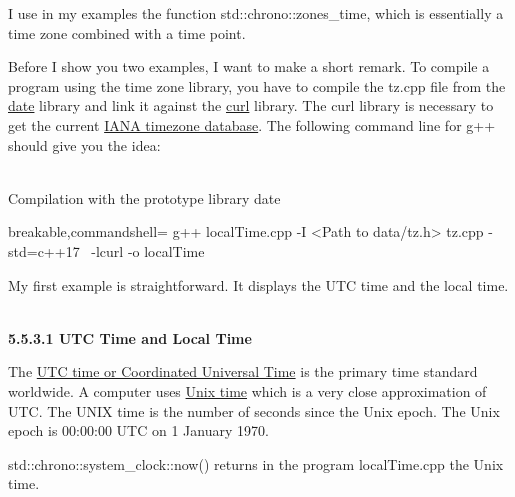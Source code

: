 I use in my examples the function std::chrono::zones\_time, which is essentially a time zone combined with a time point.

\begin{tcolorbox}[breakable,enhanced jigsaw,colback=blue!5!white,colframe=blue!75!black,title={Compilation of the examples}]
	
Before I show you two examples, I want to make a short remark. To compile a program using the time zone library, you have to compile the tz.cpp file from the \href{https://github.com/HowardHinnant/date}{date} library and link it against the \href{https://curl.se/}{curl} library. The curl library is necessary to get the current \href{https://www.iana.org/timezones}{IANA timezone database}. The following command line for g++ should give you the idea:

\hspace*{\fill} \\ %
\noindent
Compilation with the prototype library date
\begin{tcblisting}{breakable,commandshell={}}
g++ localTime.cpp -I <Path to data/tz.h> tz.cpp -std=c++17 \
  -lcurl -o localTime
\end{tcblisting}

\end{tcolorbox}

My first example is straightforward. It displays the UTC time and the local time.

\hspace*{\fill} \\ %
\noindent
\textbf{5.5.3.1\hspace{0.2cm} UTC Time and Local Time}

The \href{https://en.wikipedia.org/wiki/Coordinated_Universal_Time}{UTC time or Coordinated Universal Time} is the primary time standard worldwide. A computer uses \href{https://en.wikipedia.org/wiki/Unix_time}{Unix time} which is a very close approximation of UTC. The UNIX time is the number of seconds since the Unix epoch. The Unix epoch is 00:00:00 UTC on 1 January 1970.

std::chrono::system\_clock::now() returns in the program localTime.cpp the Unix time.

